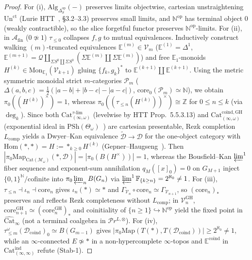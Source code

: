 \documentclass[11pt]{article}
\theoremstyle{plain}
\theoremstyle{definition}
\newcommand{\Hom}{\mathrm{Hom}}
\newcommand{\Cat}{\mathrm{Cat}}
\begin{document}
\begin{proof}
For (i), $\mathrm{Alg}_{\Delta_S^{\mathrm{op}}}(-)$ preserves limits objectwise, cartesian unstraightening $\mathrm{Un}^{\mathrm{ct}}$ (Lurie HTT~\cite{LurieHTT}, \S 3.2--3.3) preserves small limits, and $\mathbb{N}^{\mathrm{op}}$ has terminal object $0$ (weakly contractible), so the slice forgetful functor preserves $\mathbb{N}^{\mathrm{op}}$-limits. For (ii), in $\mathcal{A}_{\mathrm{fin}}$ ($0 \not\simeq 1$) $\tau_{\le 0}$ collapses $f, g$ to mutual equivalences. Inductively construct walking $(m)$-truncated equivalences $\mathbb{E}^{(m)} \in \mathcal{V}_m$ ($\mathbb{E}^{(1)} = \Delta^1$, $\mathbb{E}^{(m+1)} = \mathcal{Q} \amalg_{\Sigma S^0 \amalg \Sigma S^0} (\Sigma\mathbb{E}^{(m)} \amalg \Sigma\mathbb{E}^{(m)})$) and free $\mathbb{E}_1$-monoids $H^{(k)} \in \mathrm{Mon}_{\mathbb{E}_1}(\mathcal{V}_{k+1})$ gluing $\{f_k, g_k\}^*$ to $\mathbb{E}^{(k+1)} \amalg \mathbb{E}^{(k+1)}$. Using the metric symmetric monoidal strict $m$-categories $\mathcal{P}_m$ ($\Delta(a,b,c) = \tfrac{1}{2}(|a-b|+|b-c|-|a-c|)$, $\mathrm{core}_0(\mathcal{P}_m) \simeq \mathbb{N}$), we obtain $\pi_0((H^{(k)})^\times) = 1$, whereas $\pi_0((\tau_{\le n}(H^{(k)}))^\times) \cong \mathbb{Z}$ for $0 \le n \le k$ (via $\deg_k$). Since both $\Cat_{(\infty,\omega)}^{\tau\text{-}\mathrm{lim}}$ (levelwise by HTT Prop.~5.5.3.13) and $\Cat_{(\infty,\omega)}^{\mathrm{coind, GH}}$ (exponential ideal in $\mathrm{PSh}(\Theta_\omega)$~\cite{Goldthorpe2023}) are cartesian presentable, Rezk completion $L_{\mathrm{comp}}$ yields a Dwyer--Kan equivalence $\widetilde{\mathcal{D}} \to \mathcal{D}$ for the one-object category with $\Hom(*,*)=H := \ast_{k\ge 0} H^{(k)}$ (Gepner--Haugseng~\cite{GepnerHaugseng2015}). Then $|\pi_0\mathrm{Map}_{\Cat(\mathcal{M}_\omega)}(*, \mathcal{D})| = |\pi_0(B(H^\times))| = 1$, whereas the Bousfield--Kan $\varprojlim^1$ fiber sequence and exponent-sum annihilation $q_M([x]_0) = 0$ on $G_{M+1}$ inject $\{0,1\}^{\mathbb{N}}/\text{cofinite}$ into $\pi_0 \varprojlim_n B(G_n)$ via $\varprojlim^1 \mathbb{F}_{\{k \ge n\}} = 2^{\aleph_0} \neq 1$. For (iii), $\tau_{\le n} \dashv \iota_n \dashv \mathrm{core}_n$ gives $\iota_n(*) \simeq *$ and $\Gamma_{\mathcal{V}_n} \circ \mathrm{core}_n \simeq \Gamma_{\mathcal{V}_{n+1}}$, so $(\mathrm{core}_n)_*$ preserves and reflects Rezk completeness without $L_{\mathrm{comp}}$; in $\mathcal{V}_n^{\mathrm{GH}}$, $\mathrm{core}_{n+1}^{\mathrm{GH}} \simeq (\mathrm{core}_n^{\mathrm{GH}})_*$ and coinitiality of $\{n \ge 1\} \hookrightarrow \mathbb{N}^{\mathrm{op}}$ yield the fixed point in $\widehat{\Cat}_\infty$ (not a terminal coalgebra in $\mathcal{P}r^{L,\otimes}$). For (iv), $\tau_{\le m}^\omega(\mathcal{D}_{\mathrm{coind}})_0 \simeq B(G_{m-1})$ gives $|\pi_0\mathrm{Map}(T(*), T(\mathcal{D}_{\mathrm{coind}}))| \ge 2^{\aleph_0} \neq 1$, while an $\infty$-connected $E \not\simeq *$ in a non-hypercomplete $\infty$-topos and $\mathbb{E}^{\mathrm{coind}}$ in $\Cat_{(\infty,\infty)}^{\mathrm{ind}}$ refute (Stab-1).
\end{proof}
\end{document}
